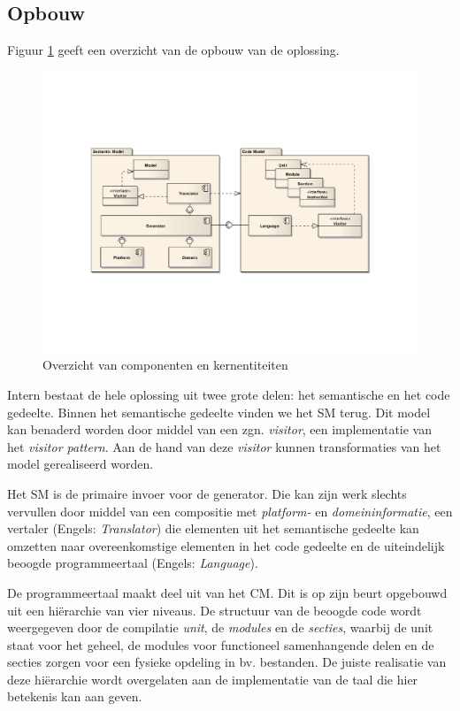 \subsection{Opbouw}

Figuur \ref{fig:devel-component-overview} geeft een overzicht van de opbouw van
de oplossing.

\begin{figure}[ht]
  \centering
  \includegraphics[width=\linewidth]{resources/component-overview.pdf}
  \caption{Overzicht van componenten en kernentiteiten}
  \label{fig:devel-component-overview}
\end{figure}

Intern bestaat de hele oplossing uit twee grote delen: het semantische en het
code gedeelte. Binnen het semantische gedeelte vinden we het SM terug. Dit
model kan benaderd worden door middel van een zgn. \emph{visitor}, een
implementatie van het \emph{visitor pattern}. Aan de hand van deze
\emph{visitor} kunnen transformaties van het model gerealiseerd worden.

Het SM is de primaire invoer voor de generator. Die kan zijn werk slechts
vervullen door middel van een compositie met \emph{platform-} en
\emph{domeininformatie}, een vertaler (Engels: \emph{Translator}) die elementen
uit het semantische gedeelte kan omzetten naar overeenkomstige elementen in het
code gedeelte en de uiteindelijk beoogde programmeertaal (Engels:
\emph{Language}).

De programmeertaal maakt deel uit van het CM. Dit is op zijn beurt opgebouwd
uit een hi\"erarchie van vier niveaus. De structuur van de beoogde code wordt
weergegeven door de compilatie \emph{unit}, de \emph{modules} en de
\emph{secties}, waarbij de unit staat voor het geheel, de modules voor
functioneel samenhangende delen en de secties zorgen voor een fysieke opdeling
in bv. bestanden. De juiste realisatie van deze hi\"erarchie wordt overgelaten
aan de implementatie van de taal die hier betekenis kan aan geven.

